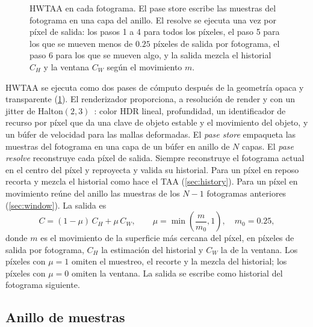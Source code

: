 \documentclass[11pt,a4paper]{article}
\begin{document}
\begin{figure}[t]
\caption{HWTAA en cada fotograma. El pase store escribe las muestras del fotograma en una capa del anillo. El resolve se ejecuta una vez por píxel de salida: los pasos 1 a 4 para todos los píxeles, el paso 5 para los que se mueven menos de $0.25$ píxeles de salida por fotograma, el paso 6 para los que se mueven algo, y la salida mezcla el historial $C_H$ y la ventana $C_W$ según el movimiento $m$.}
\label{fig:pipeline}
\end{figure}

HWTAA se ejecuta como dos pases de cómputo después de la geometría opaca y transparente (\cref{fig:pipeline}). El renderizador proporciona, a resolución de render y con un jitter de Halton$(2,3)$~\cite{halton1964}: color HDR lineal, profundidad, un identificador de recurso por píxel que da una clave de objeto estable y el movimiento del objeto, y un búfer de velocidad para las mallas deformadas. El \emph{pase store} empaqueta las muestras del fotograma en una capa de un búfer en anillo de $N$ capas. El \emph{pase resolve} reconstruye cada píxel de salida. Siempre reconstruye el fotograma actual en el centro del píxel y reproyecta y valida su historial. Para un píxel en reposo recorta y mezcla el historial como hace el TAA (\cref{sec:history}). Para un píxel en movimiento reúne del anillo las muestras de los $N-1$ fotogramas anteriores (\cref{sec:window}). La salida es
\begin{equation}
C = (1-\mu)\, C_H + \mu\, C_W, \qquad \mu = \min\!\left(\frac{m}{m_0}, 1\right), \quad m_0 = 0.25,
\label{eq:mix}
\end{equation}
donde $m$ es el movimiento de la superficie más cercana del píxel, en píxeles de salida por fotograma, $C_H$ la estimación del historial y $C_W$ la de la ventana. Los píxeles con $\mu = 1$ omiten el muestreo, el recorte y la mezcla del historial; los píxeles con $\mu=0$ omiten la ventana. La salida se escribe como historial del fotograma siguiente.

\subsection{Anillo de muestras}
\label{sec:ring}
\end{document}

